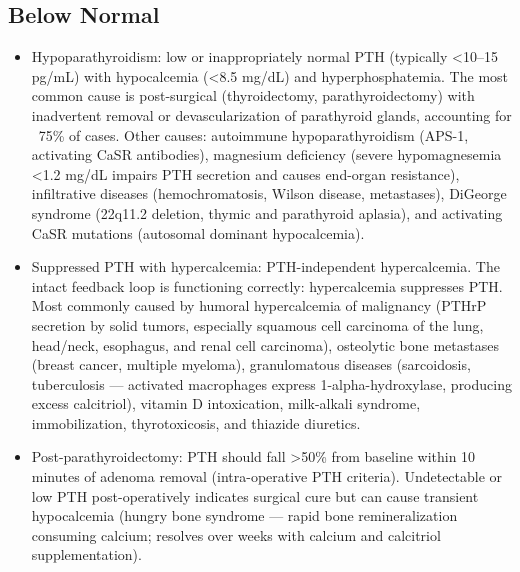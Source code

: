 \subsection*{Below Normal}
\begin{itemize}
  \item Hypoparathyroidism: low or inappropriately normal PTH (typically <10--15 pg/mL) with hypocalcemia (<8.5 mg/dL) and hyperphosphatemia. The most common cause is post-surgical (thyroidectomy, parathyroidectomy) with inadvertent removal or devascularization of parathyroid glands, accounting for ~75\% of cases. Other causes: autoimmune hypoparathyroidism (APS-1, activating CaSR antibodies), magnesium deficiency (severe hypomagnesemia <1.2 mg/dL impairs PTH secretion and causes end-organ resistance), infiltrative diseases (hemochromatosis, Wilson disease, metastases), DiGeorge syndrome (22q11.2 deletion, thymic and parathyroid aplasia), and activating CaSR mutations (autosomal dominant hypocalcemia).
  \item Suppressed PTH with hypercalcemia: PTH-independent hypercalcemia. The intact feedback loop is functioning correctly: hypercalcemia suppresses PTH. Most commonly caused by humoral hypercalcemia of malignancy (PTHrP secretion by solid tumors, especially squamous cell carcinoma of the lung, head/neck, esophagus, and renal cell carcinoma), osteolytic bone metastases (breast cancer, multiple myeloma), granulomatous diseases (sarcoidosis, tuberculosis --- activated macrophages express 1-alpha-hydroxylase, producing excess calcitriol), vitamin D intoxication, milk-alkali syndrome, immobilization, thyrotoxicosis, and thiazide diuretics.
  \item Post-parathyroidectomy: PTH should fall >50\% from baseline within 10 minutes of adenoma removal (intra-operative PTH criteria). Undetectable or low PTH post-operatively indicates surgical cure but can cause transient hypocalcemia (hungry bone syndrome --- rapid bone remineralization consuming calcium; resolves over weeks with calcium and calcitriol supplementation).
\end{itemize}

